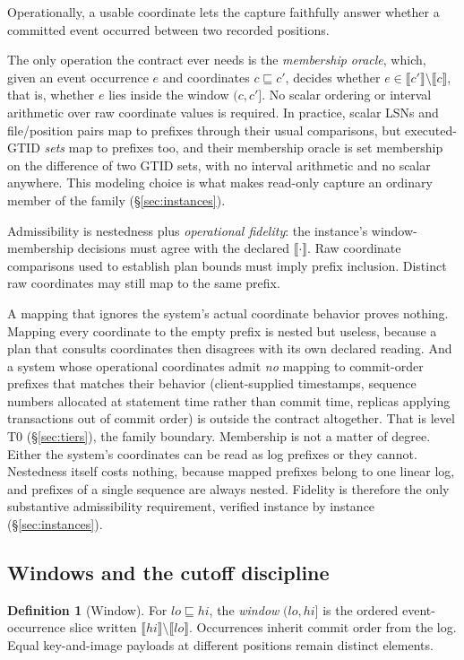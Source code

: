 \documentclass[sigconf,nonacm,10pt]{acmart}
\theoremstyle{plain}
\theoremstyle{definition}
\newtheorem{definition}{Definition}[section]
\newcommand{\den}[1]{\llbracket #1 \rrbracket}   %
\newcommand{\pre}{\sqsubseteq}                   %
\newcommand{\window}[2]{(#1,#2]}                 %
\begin{document}
Operationally, a usable coordinate lets the capture faithfully answer whether a committed event occurred between two
recorded positions.

The only operation the contract ever needs is the \emph{membership
oracle}, which, given an event occurrence $e$ and coordinates $c \pre c'$, decides
whether $e \in \den{c'} \setminus \den{c}$, that is, whether $e$
lies inside the window $\window{c}{c'}$.
No scalar ordering or interval arithmetic over raw coordinate
values is required. In practice, scalar LSNs and file/position pairs map to prefixes
through their usual comparisons, but executed-GTID \emph{sets}
map to prefixes too, and their membership oracle is set membership
on the difference of two GTID sets, with no interval arithmetic and
no scalar anywhere. This modeling choice is what makes read-only capture an ordinary member of the family
(\S\ref{sec:instances}).

Admissibility is nestedness plus \emph{operational fidelity}: the 
instance's window-membership decisions must agree with the declared
$\den{\cdot}$. Raw coordinate comparisons used to establish plan 
bounds must imply prefix inclusion. Distinct raw coordinates may still 
map to the same prefix.

A mapping that ignores the system's actual coordinate behavior
proves nothing. Mapping every coordinate to the empty prefix is nested but useless, because a plan
that consults coordinates then disagrees with its own
declared reading. And a system whose operational coordinates admit
\emph{no} mapping to commit-order prefixes that matches their behavior (client-supplied
timestamps, sequence numbers allocated at statement time rather
than commit time, replicas applying transactions out of commit
order) is outside the contract altogether. That is level T0
(\S\ref{sec:tiers}), the family boundary. Membership is not a matter of degree. Either the system's coordinates can be read as log prefixes or they cannot. Nestedness itself costs nothing,
because mapped prefixes belong to one linear log, and prefixes of a
single sequence are always nested. Fidelity is therefore the only
substantive admissibility requirement, verified instance by
instance (\S\ref{sec:instances}).

\subsection{Windows and the cutoff discipline}\label{sec:setting-windows}

\begin{definition}[Window]\label{def:window}
For $lo \pre hi$, the \emph{window} $\window{lo}{hi}$ is the ordered
event-occurrence slice written $\den{hi} \setminus \den{lo}$.
Occurrences inherit commit order from the log. Equal key-and-image
payloads at different positions remain distinct elements.
\end{definition}
\end{document}
